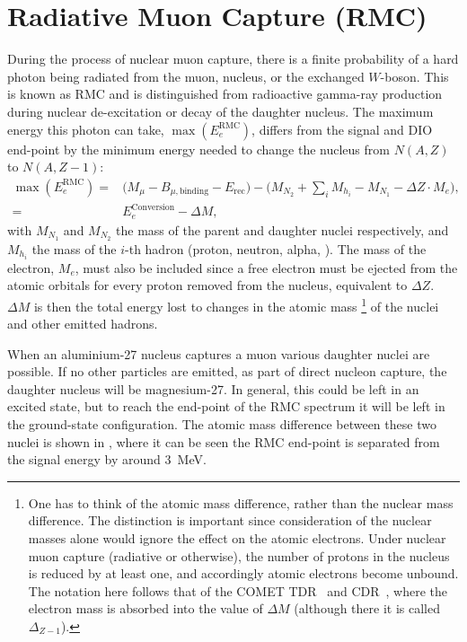 \section{Radiative Muon Capture (\acs{RMC})}
\TabRMCEndPoints%
During the process of nuclear muon capture, there is a finite probability of a hard photon being radiated from the muon, nucleus, or the exchanged $W$-boson.
This is known as \acf{RMC} and is distinguished from radioactive gamma-ray production during nuclear de-excitation or decay of the daughter nucleus.
The maximum energy this photon can take, $\max(E_e^\textrm{RMC})$, differs from the \mueconv signal and \ac{DIO} end-point by the minimum energy needed to change the nucleus from $N(A,Z)$ to $N(A,Z-1)$:
\begin{align}
\max(E_e^\textrm{RMC})=&\big(M_\mu - B_{\mu,\textrm{binding}} - E_\textrm{rec}\big)-\big(M_{N_2}+\sum_iM_{h_i}-M_{N_1}-\Delta{}Z\cdot{}M_e\big),\\
                      =&E^\textrm{Conversion}_e  - \Delta{}M,
\end{align}
with $M_{N_1}$ and $M_{N_2}$ the mass of the parent and daughter nuclei respectively, and $M_{h_i}$ the mass of the $i$-th hadron (proton, neutron, alpha, \etc).
The mass of the electron, $M_e$, must also be included since a free electron must be ejected from the atomic orbitals for every proton removed from the nucleus, equivalent to $\Delta{}Z$.
$\Delta{}M$ is then the total energy lost to changes in the atomic mass%
\footnote{
One has to think of the atomic mass difference, rather than the nuclear mass difference.
The distinction is important since consideration of the nuclear masses alone would ignore the effect on the atomic electrons.
Under nuclear muon capture (radiative or otherwise), the number of protons in the nucleus is reduced by at least one, and accordingly atomic electrons become unbound.
The notation here follows that of the COMET TDR~\cite{TDR2016} and CDR~\cite{CDRphase2}, where the electron mass is absorbed into the value of $\Delta{}M$ (although there it is called $\Delta_{Z-1}$).
}
of the nuclei and other emitted hadrons.

When an aluminium-27 nucleus captures a muon various daughter nuclei are possible.
If no other particles are emitted, as part of direct nucleon capture, the daughter nucleus will be magnesium-27.
In general, this could be left in an excited state, but to reach the end-point of the \ac{RMC} spectrum it will be left in the ground-state configuration.
The atomic mass difference between these two nuclei is shown in , where it can be seen the RMC end-point is separated from the \mueconv signal energy by around 3~MeV.

